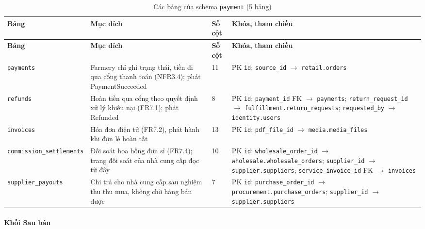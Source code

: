 \begingroup
\tblsetup\footnotesize\renewcommand{\arraystretch}{1.1}
\begin{longtable}{L{3.20cm} L{5.60cm} L{1.10cm} L{5.00cm}}
\caption{Các bảng của schema \texttt{payment} (5 bảng)}
\label{tab:db-payment} \\
\toprule
{}
\textbf{Bảng} & \textbf{Mục đích} & \textbf{Số cột} & \textbf{Khóa, tham chiếu} \\
\midrule
\endfirsthead
\toprule
{}
\textbf{Bảng} & \textbf{Mục đích} & \textbf{Số cột} & \textbf{Khóa, tham chiếu} \\
\midrule
\endhead
\bottomrule
\endfoot
\texttt{payments} & Farmery chỉ ghi trạng thái, tiền đi qua cổng thanh toán (NFR3.4); phát PaymentSucceeded & 11 & PK \texttt{id}; \texttt{source\_\allowbreak{}id} $\to$ \texttt{retail.orders} \\
\texttt{refunds} & Hoàn tiền qua cổng theo quyết định xử lý khiếu nại (FR7.1); phát Refunded & 8 & PK \texttt{id}; \texttt{payment\_\allowbreak{}id} FK $\to$ \texttt{payments}; \texttt{return\_\allowbreak{}request\_\allowbreak{}id} $\to$ \texttt{fulfillment.return\_\allowbreak{}requests}; \texttt{requested\_\allowbreak{}by} $\to$ \texttt{identity.users} \\
\texttt{invoices} & Hóa đơn điện tử (FR7.2), phát hành khi đơn lẻ hoàn tất & 13 & PK \texttt{id}; \texttt{pdf\_\allowbreak{}file\_\allowbreak{}id} $\to$ \texttt{media.media\_\allowbreak{}files} \\
\texttt{commission\_\allowbreak{}settlements} & Đối soát hoa hồng đơn sỉ (FR7.4); trang đối soát của nhà cung cấp đọc từ đây & 10 & PK \texttt{id}; \texttt{wholesale\_\allowbreak{}order\_\allowbreak{}id} $\to$ \texttt{wholesale.wholesale\_\allowbreak{}orders}; \texttt{supplier\_\allowbreak{}id} $\to$ \texttt{supplier.suppliers}; \texttt{service\_\allowbreak{}invoice\_\allowbreak{}id} FK $\to$ \texttt{invoices} \\
\texttt{supplier\_\allowbreak{}payouts} & Chi trả cho nhà cung cấp sau nghiệm thu thu mua, không chờ hàng bán được & 7 & PK \texttt{id}; \texttt{purchase\_\allowbreak{}order\_\allowbreak{}id} $\to$ \texttt{procurement.purchase\_\allowbreak{}orders}; \texttt{supplier\_\allowbreak{}id} $\to$ \texttt{supplier.suppliers} \\
\end{longtable}
\endgroup

\paragraph*{Khối Sau bán}

